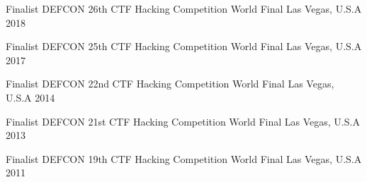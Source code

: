 

\begin{cvhonors}

  \cvhonor
  {Finalist} %
  {DEFCON 26th CTF Hacking Competition World Final} %
  {Las Vegas, U.S.A} %
  {2018} %

  \cvhonor
  {Finalist} %
  {DEFCON 25th CTF Hacking Competition World Final} %
  {Las Vegas, U.S.A} %
  {2017} %

  \cvhonor
  {Finalist} %
  {DEFCON 22nd CTF Hacking Competition World Final} %
  {Las Vegas, U.S.A} %
  {2014} %

  \cvhonor
  {Finalist} %
  {DEFCON 21st CTF Hacking Competition World Final} %
  {Las Vegas, U.S.A} %
  {2013} %

  \cvhonor
  {Finalist} %
  {DEFCON 19th CTF Hacking Competition World Final} %
  {Las Vegas, U.S.A} %
  {2011} %

\end{cvhonors}



